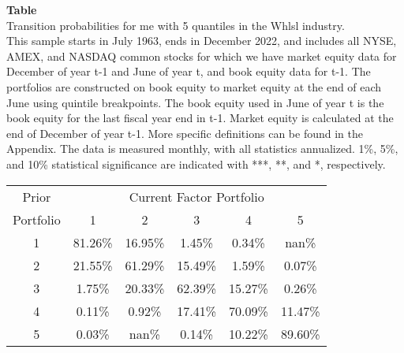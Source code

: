 \begin{table*}[ht!]
\raggedright
{}
\label{tab: transition_probs_me_Whlsl_with_5_quantiles}
\textbf{Table \thetable} \\
Transition probabilities for me with 5 quantiles in the Whlsl industry. \\
\hspace*{1em}This sample starts in July 1963, ends in December 2022, and includes all NYSE, AMEX, and NASDAQ common stocks for which we have market equity data for December of year t-1 and June of year t, and book equity data for t-1. The portfolios are constructed on book equity to market equity at the end of each June using quintile breakpoints.  The book equity used in June of year t is the book equity for the last fiscal year end in t-1.  Market equity is calculated at the end of December of year t-1.  More specific definitions can be found in the Appendix.  The data is measured monthly, with all statistics annualized.  1\%, 5\%, and 10\% statistical significance are indicated with ***, **, and *, respectively. \\
\vspace{0.5em}
\centering
\begin{adjustbox}{max width=\textwidth}
\begin{tabular}{@{}cccccc@{}}
\toprule
Prior & \multicolumn{5}{c}{Current Factor Portfolio} \\
Portfolio & 1 & 2 & 3 & 4 & 5 \\
\midrule
1 & 81.26\% & 16.95\% & 1.45\% & 0.34\% & nan\% \\
2 & 21.55\% & 61.29\% & 15.49\% & 1.59\% & 0.07\% \\
3 & 1.75\% & 20.33\% & 62.39\% & 15.27\% & 0.26\% \\
4 & 0.11\% & 0.92\% & 17.41\% & 70.09\% & 11.47\% \\
5 & 0.03\% & nan\% & 0.14\% & 10.22\% & 89.60\% \\
\bottomrule
\end{tabular}
\end{adjustbox}
\end{table*}